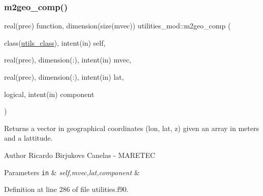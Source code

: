 \subsubsection{\texorpdfstring{m2geo\+\_\+comp()}{m2geo\_comp()}}
{\footnotesize\ttfamily real(prec) function, dimension(size(mvec)) utilities\+\_\+mod\+::m2geo\+\_\+comp (\begin{DoxyParamCaption}\item[{class(\mbox{\hyperlink{structutilities__mod_1_1utils__class}{utils\+\_\+class}}), intent(in)}]{self,  }\item[{real(prec), dimension(\+:), intent(in)}]{mvec,  }\item[{real(prec), dimension(\+:), intent(in)}]{lat,  }\item[{logical, intent(in)}]{component }\end{DoxyParamCaption})\hspace{0.3cm}{\ttfamily [private]}}



Returns a vector in geographical coordinates (lon, lat, z) given an array in meters and a lattitude. 

\begin{DoxyAuthor}{Author}
Ricardo Birjukovs Canelas -\/ M\+A\+R\+E\+T\+EC 
\end{DoxyAuthor}

\begin{DoxyParams}[1]{Parameters}
\mbox{\tt in}  & {\em self,mvec,lat,component} & \\
\hline
\end{DoxyParams}


Definition at line 286 of file utilities.\+f90.


